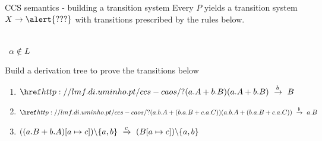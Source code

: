 \documentclass[aspectratio=169]{beamer}
\begin{document}
\begin{slide}{CCS semantics - building a transition system}
\small 
Every $P$ yields a transition system $X \to {\alert{???}}$ with transitions prescribed by the rules below.

\vspace*{-1mm}
\centering
\newcommand{\msep}{~~~~~~}

\msep
{} %
\msep
{} %
\\[3mm]
~${\alpha%
                                                                  \notin L}$
\msep
{}
\msep
{}
\\[6mm]

\pause

\begin{exampleblock}{\exercise Build a derivation tree to prove the transitions below}
  \vspace*{-2mm}
  \begin{enumerate}
    \item $\goOn{(a.A + b.B)} ~\trans{b}~ B$
    \item $\goOn{(a.b.A + (b.a.B + c.a.C))} ~\trans{b}~ a.B$
    \item $((a.B + b.A)[a \mapsto c])\backslash\{a,b\} ~\xrightarrow{c}~ (B[a\mapsto c])\backslash\{a,b\}$
  \end{enumerate}
\end{exampleblock}

\end{slide}
\end{document}
